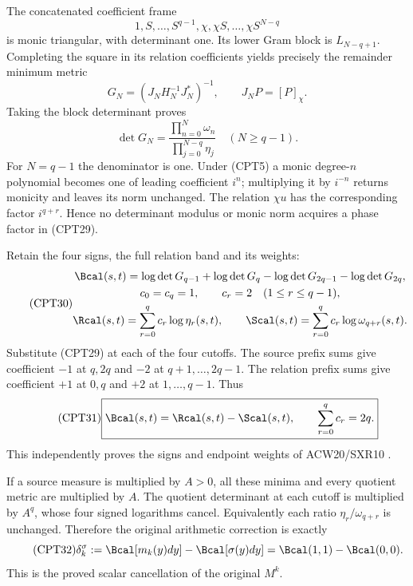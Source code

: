 \documentclass[11pt,a4paper]{article}
\begin{document}
The concatenated coefficient frame
\[
 1,S,\ldots,S^{q-1},\chi,\chi S,\ldots,\chi S^{N-q}
\]
is monic triangular, with determinant one.
Its lower Gram block is \(L_{N-q+1}\).  Completing the square
in its relation coefficients yields precisely the remainder
minimum metric
\[
 G_N=(J_NH_N^{-1}J_N^*)^{-1},\qquad
 J_NP=[P]_\chi.
\]
Taking the block determinant proves
\begin{equation}\tag{CPT29}
 \det G_N=
 \frac{\prod_{n=0}^N\omega_n}
      {\prod_{j=0}^{N-q}\eta_j}\quad(N\ge q-1).
\end{equation}
For \(N=q-1\) the denominator is one.
Under (CPT5) a monic degree-\(n\) polynomial becomes one of
leading coefficient \(i^n\); multiplying it by \(i^{-n}\)
returns monicity and leaves its norm unchanged.  The relation
\(\chi u\) has the corresponding factor \(i^{q+r}\).
Hence no determinant modulus or monic norm acquires a phase
factor in (CPT29).

Retain the four signs, the full relation band and its weights:
\begin{equation}\tag{CPT30}
\begin{gathered}
 \Bcal(s,t)=\log\det G_{q-1}+\log\det G_q
             -\log\det G_{2q-1}-\log\det G_{2q},\\
 c_0=c_q=1,\qquad c_r=2\quad(1\le r\le q-1),\\
 \Rcal(s,t)=\sum_{r=0}^q c_r\log\eta_r(s,t),\qquad
 \Scal(s,t)=\sum_{r=0}^q c_r\log\omega_{q+r}(s,t).
\end{gathered}
\end{equation}
Substitute (CPT29) at each of the four cutoffs.
The source prefix sums give coefficient \(-1\) at \(q,2q\)
and \(-2\) at \(q+1,\ldots,2q-1\).
The relation prefix sums give coefficient \(+1\) at \(0,q\)
and \(+2\) at \(1,\ldots,q-1\).  Thus
\begin{equation}\tag{CPT31}
 \boxed{\Bcal(s,t)=\Rcal(s,t)-\Scal(s,t),\qquad
 \sum_{r=0}^q c_r=2q.}
\end{equation}
This independently proves the signs and endpoint weights of
ACW20/SXR10 \cite{cpt:centralProvider,cpt:sourceRelation}.

If a source measure is multiplied by \(A>0\), all these minima
and every quotient metric are multiplied by \(A\).
The quotient determinant at each cutoff is multiplied by
\(A^q\), whose four signed logarithms cancel.
Equivalently each ratio \(\eta_r/\omega_{q+r}\) is unchanged.
Therefore the original arithmetic correction is exactly
\begin{equation}\tag{CPT32}
 \delta_k^\sigma
 :=\Bcal[m_k(y)dy]-\Bcal[\sigma(y)dy]
 =\Bcal(1,1)-\Bcal(0,0).
\end{equation}
This is the proved scalar cancellation of the original \(M^k\).
\end{document}

